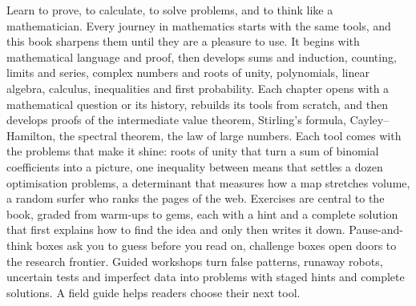 Learn to prove, to calculate, to solve problems, and to think like a mathematician.
Every journey in mathematics starts with the same tools, and this book sharpens them until they are a pleasure to use.
It begins with mathematical language and proof, then develops sums and induction, counting, limits and series,
complex numbers and roots of unity, polynomials, linear algebra, calculus, inequalities and first probability. Each chapter opens with
a mathematical question or its history, rebuilds its tools from scratch, and then develops proofs of the
intermediate value theorem, Stirling's formula, Cayley--Hamilton, the spectral theorem, the law of large numbers.
Each tool comes with the problems that make it shine: roots of unity that turn a sum of binomial coefficients into a picture,
one inequality between means that settles a dozen optimisation problems, a determinant that measures how a map stretches
volume, a random surfer who ranks the pages of the web. Exercises are central to the book, graded from warm-ups to gems,
each with a hint and a complete solution that first explains how to find the idea and only then writes it down.
Pause-and-think boxes ask you to guess before you read on, challenge boxes open doors to the research frontier. Guided workshops turn false patterns, runaway robots, uncertain tests and imperfect data into problems with staged hints and complete solutions. A field guide helps readers choose their next tool.
